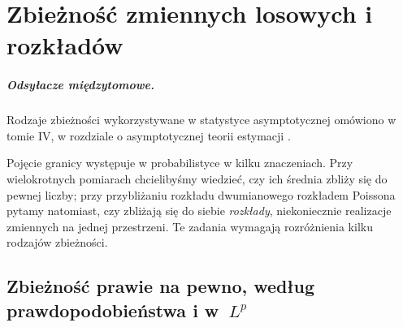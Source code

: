 \chapter{Zbieżność zmiennych losowych i rozkładów}
\label{ch:convergence}

\providecommand{\atlasref}[2]{#2}

\paragraph{Odsyłacze międzytomowe.}
Rodzaje zbieżności wykorzystywane w statystyce
asymptotycznej omówiono w tomie IV, w rozdziale
o asymptotycznej teorii estymacji%
.


Pojęcie granicy występuje w probabilistyce w kilku znaczeniach.
Przy wielokrotnych pomiarach chcielibyśmy wiedzieć, czy
ich średnia zbliży się do pewnej liczby; przy przybliżaniu
rozkładu dwumianowego rozkładem Poissona pytamy natomiast,
czy zbliżają się do siebie \emph{rozkłady}, niekoniecznie
realizacje zmiennych na jednej przestrzeni. Te zadania
wymagają rozróżnienia kilku rodzajów zbieżności.

\section{Zbieżność prawie na pewno, według prawdopodobieństwa i w~\texorpdfstring{$L^p$}{Lp}}

